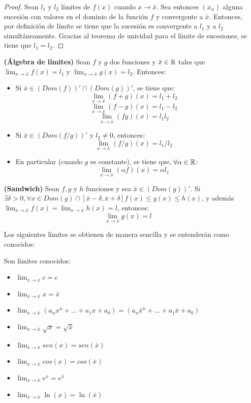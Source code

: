 \begin{proof}
	Sean $l_1$ y $l_2$ límites de $f(x)$ cuando $x\rightarrow \bar{x}$. Sea entonces $(x_n)$ alguna sucesión con valores en el dominio de la función $f$ y convergente a $\bar{x}$. Entonces, por definición de límite se tiene que la sucesión es convergente a $l_1$ y a $l_2$ simultáneamente. Gracias al teorema de unicidad para el límite de sucesiones, se tiene que $l_1 = l_2$. 
\end{proof}

\begin{teorema}
	\textbf{(Álgebra de límites)}
	Sean $f$ y $g$ dos funciones y $\bar{x}\in \mathbb{R}$ tales que $ \lim_{x\rightarrow\bar{x}} f(x) = l_1$ y $\lim_{x\rightarrow\bar{x}}g(x) = l_2$. Entonces: 
	\begin{itemize}
		\item Si $\bar{x} \in (Dom(f))' \cap (Dom(g))'$, se tiene que: 
		$$ \lim_{x\rightarrow\bar{x}}(f+g)(x) = l_1 + l_2 $$ 
		$$ \lim_{x\rightarrow\bar{x}}(f-g)(x) = l_1 - l_2 $$ 
		$$ \lim_{x\rightarrow\bar{x}}(fg)(x) = l_1  l_2 $$ 
		\item Si $\bar{x} \in (Dom(f/g))'$ y $l_2 \neq 0$, entonces: 
		$$ \lim_{x\rightarrow\bar{x}} (f/g)(x) = l_1/l_2 $$ 
		\item En particular (cuando $g$ es constante), se tiene que, $\forall \alpha \in \mathbb{R}$: 
		$$ \lim_{x\rightarrow\bar{x}} (\alpha f ) (x) = \alpha l_1 $$ 
	\end{itemize}
\end{teorema}

\begin{teorema}
	\textbf{(Sandwich)}
	Sean $f, g$ y $h$ funciones y sea $\bar{x} \in (Dom(g))'$. 
	Si $\exists \delta > 0, \forall x \in Dom(g) \cap [\bar{x} - \delta , \bar{x} + \delta ] f(x) \leq g(x) \leq h(x) $, y además $\lim_{x\rightarrow\bar{x}} f(x) = \lim_{x\rightarrow\bar{x}} h(x) = l$, entonces: 
	$$ \lim_{x\rightarrow\bar{x}} g(x) = l $$ 
\end{teorema}


Los siguientes límites se obtienen de manera sencilla y se entenderán como conocidos: 

\begin{proposicion}
	Son límites conocidos:
	\begin{itemize}
		\item $\lim_{x\rightarrow\bar{x}} c = c $
		\item $\lim_{x\rightarrow\bar{x}} x = \bar{x}$
		\item $\lim_{x\rightarrow\bar{x}} (a_n x^n + ... + a_1 x + a_0) = (a_n \bar{x}^n + ... + a_1 \bar{x} + a_0)$
		\item $\lim_{x\rightarrow\bar{x}} \sqrt{x} = \sqrt{\bar{x}}$
		\item $\lim_{x\rightarrow\bar{x}} sen(x) = sen(\bar{x})$
		\item $\lim_{x\rightarrow\bar{x}} cos(x) = cos(\bar{x})$ 
		\item $\lim_{x\rightarrow\bar{x}} e^x = e^{\bar{x}}$
		\item $\lim_{x\rightarrow\bar{x}} \ln(x) = \ln(\bar{x})$ 
	\end{itemize}
\end{proposicion}

